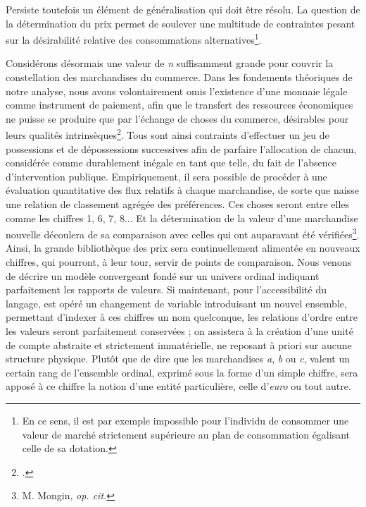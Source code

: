 { Persiste toutefois un élément de généralisation qui doit être résolu. La question de la détermination du prix permet de soulever une multitude de contraintes pesant sur la désirabilité relative des consommations alternatives\footnote{En ce sens, il est par exemple impossible pour l'individu de consommer une valeur de marché strictement supérieure au plan de consommation égalisant celle de sa dotation.}.\par
 
 Considérons désormais une valeur de \emph{n} suffisamment grande pour couvrir la constellation des marchandises du commerce. Dans les fondements théoriques de notre analyse, nous avons volontairement omis l'existence d'une monnaie légale comme instrument de paiement, afin que le transfert des ressources économiques ne puisse se produire que par l'échange de choses du commerce, désirables pour leurs qualités intrinsèques\footnote{.}. Tous sont ainsi contraints d'effectuer un jeu de possessions et de dépossessions successives afin de parfaire l'allocation de chacun, considérée comme durablement inégale en tant que telle, du fait de l'absence d'intervention publique. Empiriquement, il sera possible de procéder à une évaluation quantitative des flux relatifs à chaque marchandise, de sorte que naisse une relation de classement agrégée des préférences. Ces choses seront entre elles comme les chiffres 1, 6, 7, 8... Et la détermination de la valeur d'une marchandise nouvelle découlera de sa comparaison avec celles qui ont auparavant été vérifiées\footnote{M. Mongin, \emph{op. cit.}}. Ainsi, la grande bibliothèque des prix sera continuellement alimentée en nouveaux chiffres, qui pourront, à leur tour, servir de points de comparaison. Nous venons de décrire un modèle convergeant fondé sur un univers ordinal indiquant parfaitement les rapports de valeurs. Si maintenant, pour l'accessibilité du langage, est opéré un changement de variable introduisant un nouvel ensemble, permettant d'indexer à ces chiffres un nom quelconque, les relations d'ordre entre les valeurs seront parfaitement conservées ; on assistera à la création d'une unité de compte abstraite et strictement immatérielle, ne reposant à priori sur aucune structure physique. Plutôt que de dire que les marchandises \emph{a}, \emph{b} ou \emph{c}, valent un certain rang de l'ensemble ordinal, exprimé sous la forme d'un simple chiffre, sera apposé à ce chiffre la notion d'une entité particulière, celle d'\emph{euro} ou tout autre.\par
 
}
